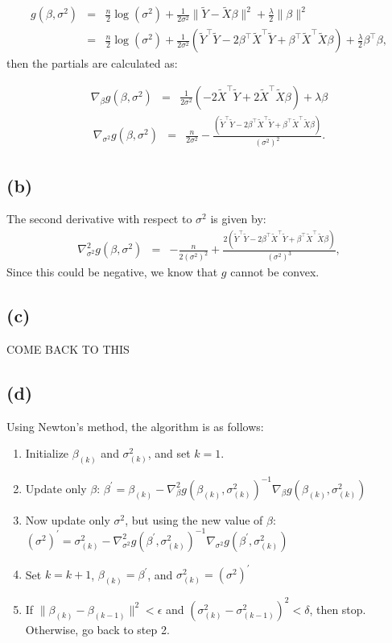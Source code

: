 \documentclass{article}\usepackage[]{graphicx}\usepackage[]{color}
\begin{document}
\begin{eqnarray*}
  g(\beta,\sigma^2) &=& \frac{n}{2}\log(\sigma^2) + \frac{1}{2\sigma^2}\|\tilde{Y}-\tilde{X}\beta\|^2 + \frac{\lambda}{2}\|\beta\|^2 \\
        &=& \frac{n}{2}\log(\sigma^2) + \frac{1}{2\sigma^2}(\tilde{Y}^\top\tilde{Y}-2\beta^\top\tilde{X}^\top\tilde{Y} + \beta^\top\tilde{X}^\top\tilde{X}\beta) + \frac{\lambda}{2}\beta^\top\beta,
\end{eqnarray*}
then the partials are calculated as:

\begin{eqnarray*}
  \nabla_\beta g(\beta,\sigma^2) &=& \frac{1}{2\sigma^2}\left( -2\tilde{X}^\top\tilde{Y} + 2\tilde{X}^\top\tilde{X}\beta \right) + \lambda\beta
\end{eqnarray*}
\begin{eqnarray*}
  \nabla_{\sigma^2} g(\beta,\sigma^2) &=& \frac{n}{2\sigma^2} - \frac{(\tilde{Y}^\top\tilde{Y} - 2\beta^\top\tilde{X}^\top\tilde{Y} + \beta^\top\tilde{X}^\top\tilde{X}\beta)}{(\sigma^2)^2}.
\end{eqnarray*}

\subsection*{(b)}
The second derivative with respect to $\sigma^2$ is given by:
\begin{eqnarray*}
  \nabla_{\sigma^2}^2 g(\beta,\sigma^2) &=& -\frac{n}{2(\sigma^2)^2} + \frac{2(\tilde{Y}^\top\tilde{Y} - 2\beta^\top\tilde{X}^\top\tilde{Y} + \beta^\top\tilde{X}^\top\tilde{X}\beta)}{(\sigma^2)^3},
\end{eqnarray*}
Since this could be negative, we know that $g$ cannot be convex.

\subsection*{(c)}
COME BACK TO THIS

\subsection*{(d)}
Using Newton's method, the algorithm is as follows:
\begin{enumerate}
  \item Initialize $\beta_{(k)}$ and $\sigma^2_{(k)}$, and set $k=1$.
  \item Update only $\beta$: $\beta^\prime=\beta_{(k)}-\nabla^2_\beta g(\beta_{(k)},\sigma^2_{(k)})^{-1}\nabla_\beta g(\beta_{(k)},\sigma^2_{(k)})$
  \item Now update only $\sigma^2$, but using the new value of $\beta$:  $(\sigma^2)^\prime = \sigma^2_{(k)} - \nabla^2_{\sigma^2} g(\beta^\prime,\sigma^2_{(k)})^{-1} \nabla_{\sigma^2} g(\beta^\prime,\sigma^2_{(k)})$
  \item Set $k=k+1$, $\beta_{(k)} = \beta^\prime$, and $\sigma^2_{(k)} = (\sigma^2)^\prime $
  \item If $\|\beta_{(k)}-\beta_{(k-1)}\|^2 < \epsilon$ and $(\sigma^2_{(k)}-\sigma^2_{(k-1)})^2 < \delta$, then stop.  Otherwise, go back to step 2.
\end{enumerate}
\end{document}

